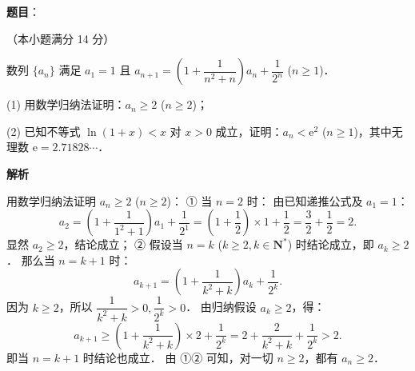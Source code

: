 \begin{answer}


\end{answer}
\begin{answer}

\textbf{题目}：

（本小题满分 14 分）

数列 $\{a_n\}$ 满足 $a_1 = 1$ 且 $a_{n+1} = \left(1 + \dfrac{1}{n^2 + n}\right) a_n + \dfrac{1}{2^n}$ ($n \geqslant 1$)．

(1) 用数学归纳法证明：$a_n \geqslant 2$ ($n \geqslant 2$)；

(2) 已知不等式 $\ln(1 + x) < x$ 对 $x > 0$ 成立，证明：$a_n < \mathrm{e}^2$ ($n \geqslant 1$)，其中无理数 $\mathrm{e} = 2.71828\cdots$．

\textbf{解析}


用数学归纳法证明 $a_n \geqslant 2$ ($n \geqslant 2$)：
① 当 $n = 2$ 时：
由已知递推公式及 $a_1 = 1$：
\nopagebreak[4]
\[
a_2 = \left(1 + \frac{1}{1^2 + 1}\right) a_1 + \frac{1}{2^1} = \left(1 + \frac{1}{2}\right) \times 1 + \frac{1}{2} = \frac{3}{2} + \frac{1}{2} = 2.
\]
显然 $a_2 \geqslant 2$，结论成立；
② 假设当 $n = k$ ($k \geqslant 2, k \in \mathbf{N}^*$) 时结论成立，即 $a_k \geqslant 2$．
那么当 $n = k + 1$ 时：
\nopagebreak[4]
\[
a_{k+1} = \left(1 + \frac{1}{k^2 + k}\right) a_k + \frac{1}{2^k}.
\]
因为 $k \geqslant 2$，所以 $\dfrac{1}{k^2 + k} > 0, \dfrac{1}{2^k} > 0$．
由归纳假设 $a_k \geqslant 2$，得：
\nopagebreak[4]
\[
a_{k+1} \geqslant \left(1 + \frac{1}{k^2 + k}\right) \times 2 + \frac{1}{2^k} = 2 + \frac{2}{k^2 + k} + \frac{1}{2^k} > 2.
\]
即当 $n = k + 1$ 时结论也成立．
由 ①② 可知，对一切 $n \geqslant 2$，都有 $a_n \geqslant 2$．



\end{answer}
